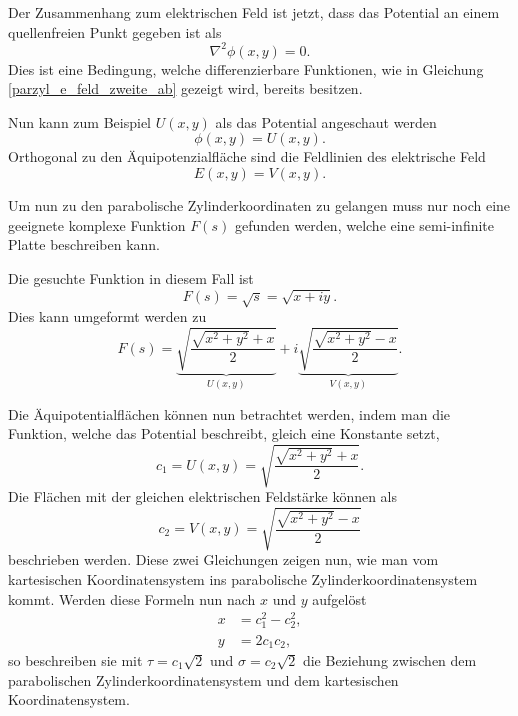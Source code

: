  
Der Zusammenhang zum elektrischen Feld ist jetzt, dass das Potential an einem quellenfreien Punkt gegeben ist als 
\begin{equation}
	\nabla^2\phi(x,y) = 0.
\end{equation}
Dies ist eine Bedingung, welche differenzierbare Funktionen, wie in Gleichung \eqref{parzyl_e_feld_zweite_ab} gezeigt wird, bereits besitzen. 


Nun kann zum Beispiel $U(x,y)$ als das Potential angeschaut werden
\begin{equation}
	\phi(x,y) = U(x,y).
\end{equation}
Orthogonal zu den Äquipotenzialfläche sind die Feldlinien des elektrische Feld
\begin{equation}
	E(x,y) = V(x,y).
\end{equation}


Um nun zu den parabolische Zylinderkoordinaten zu gelangen muss nur noch eine geeignete 
komplexe Funktion $F(s)$ gefunden werden, 
welche eine semi-infinite Platte beschreiben kann.


Die gesuchte Funktion in diesem Fall ist
\begin{equation}
	F(s) 
	= 
	\sqrt{s} 
	= 
	\sqrt{x + iy}.
\end{equation}
Dies kann umgeformt werden zu
\begin{equation}
	F(s) 
	= 
	\underbrace{\sqrt{\frac{\sqrt{x^2+y^2} + x}{2}}}_{U(x,y)} 
	+ 
	i\underbrace{\sqrt{\frac{\sqrt{x^2+y^2} - x}{2}}}_{V(x,y)}
	.
\end{equation}


Die Äquipotentialflächen können nun betrachtet werden, 
indem man die Funktion, welche das Potential beschreibt, gleich eine Konstante setzt,
\begin{equation}
	c_1 = U(x,y) = \sqrt{\frac{\sqrt{x^2+y^2} + x}{2}}.
\end{equation}
Die Flächen mit der gleichen elektrischen Feldstärke können als
\begin{equation}
	c_2 = V(x,y) = \sqrt{\frac{\sqrt{x^2+y^2} - x}{2}}
\end{equation}
beschrieben werden. Diese zwei Gleichungen zeigen nun, wie man vom 
kartesischen Koordinatensystem ins parabolische Zylinderkoordinatensystem kommt.
Werden diese Formeln nun nach $x$ und $y$ aufgelöst 
\begin{align}
	x &=  c_1^2 - c_2^2 ,\\
	y &= 2c_1 c_2,
\end{align}
so beschreiben sie mit $\tau = c_1 \sqrt{2}$ und $\sigma = c_2 \sqrt{2}$ die Beziehung 
zwischen dem parabolischen Zylinderkoordinatensystem und dem kartesischen Koordinatensystem.

